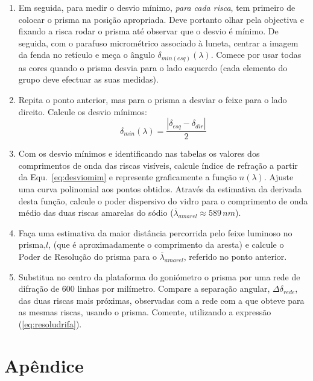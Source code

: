 \documentclass[a4paper,12pt]{article}  %
\begin{document}
\begin{enumerate}
\item  Em seguida, para medir o desvio mínimo,  \emph{para cada risca}, tem primeiro de colocar o prisma na posição apropriada. Deve portanto olhar pela objectiva e fixando a risca  rodar o prisma até observar que o desvio é mínimo.
De seguida,  com  o  parafuso micrométrico associado à luneta, centrar  a imagem  da fenda no retículo e meça o  ângulo  $\delta_{min(esq)}(\lambda)$. Comece por usar todas as cores quando o prisma desvia para o lado esquerdo (cada elemento do grupo deve efectuar as suas medidas). 
\item Repita o ponto anterior, mas para o prisma a desviar o feixe para o lado direito. Calcule os desvio mínimos:
$$\delta_{min}(\lambda) = \frac{|\delta_{esq} -  \delta_{dir}|}{2}$$ 
\item Com os desvio mínimos e identificando  nas tabelas os valores  dos  comprimentos  de onda das riscas visíveis, calcule  
índice de refração a partir da Equ.~\ref{eq:desviomim} e represente  graficamente a função $n(\lambda)$. Ajuste uma curva polinomial aos pontos obtidos. Através da  estimativa da derivada desta função, calcule o poder dispersivo do vidro para o comprimento de onda médio das 
duas riscas amarelas do sódio ($\overline{\lambda}_{amarel}\approx 589\,nm$). 
\item Faça uma estimativa da maior distância percorrida pelo feixe luminoso no prisma,$l$, (que é aproximadamente o comprimento da aresta) e calcule 
  o  Poder  de  Resolução  do  prisma  para  o  $\overline{\lambda}_{amarel}$, referido  no  ponto  anterior. 
\item Substitua no centro da plataforma do goniómetro o prisma por uma rede de difração de 
600 linhas por milímetro. Compare a separação angular, $\Delta \delta_{rede}$, das duas riscas mais próximas, 
observadas  com  a  rede  com  a  que  obteve  para  as  mesmas  riscas,  usando  o  prisma. 
Comente, utilizando a expressão (\ref{eq:resoludrifa}). 

\end{enumerate}

\section*{\sf Apêndice}
\end{document}
